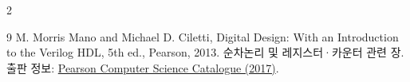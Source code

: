 \documentclass[a4paper,10pt]{article}
\begin{document}
\begin{multicols}{2}
\begin{thebibliography}{9}
 M. Morris Mano and Michael D. Ciletti,
\textnormal{Digital Design: With an Introduction to the Verilog HDL},
5th ed., Pearson, 2013.
순차논리 및 레지스터·카운터 관련 장.
출판 정보: \href{https://in.pearson.com/content/dam/region-growth/india/pearson-india/About-Us/pdf/CSE_2017.pdf}{Pearson Computer Science Catalogue (2017)}.
\end{thebibliography}
\end{multicols}
\end{document}
